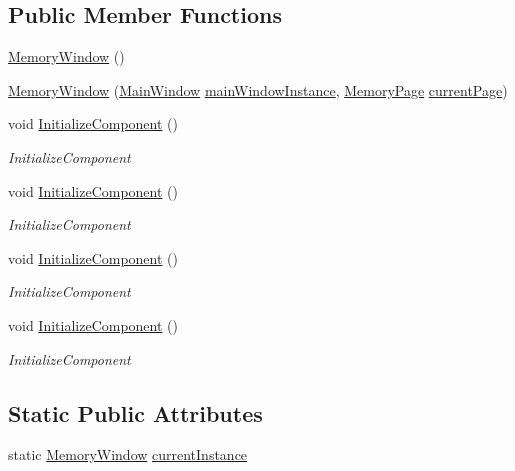 \subsection*{Public Member Functions}
\begin{DoxyCompactItemize}
\item 
\hyperlink{class_c_p_u___o_s___simulator_1_1_memory_window_a9c72b7aa51f734437bd5e4aa26a230a2}{Memory\+Window} ()
\item 
\hyperlink{class_c_p_u___o_s___simulator_1_1_memory_window_a983d730d6caccfeadb419b26a70b0150}{Memory\+Window} (\hyperlink{class_c_p_u___o_s___simulator_1_1_main_window}{Main\+Window} \hyperlink{class_c_p_u___o_s___simulator_1_1_memory_window_a349bd876862c9360ccd4533dc8de8bf3}{main\+Window\+Instance}, \hyperlink{class_c_p_u___o_s___simulator_1_1_memory_1_1_memory_page}{Memory\+Page} \hyperlink{class_c_p_u___o_s___simulator_1_1_memory_window_ae1b974c8b976e19dde1a5491e3fe0e37}{current\+Page})
\item 
void \hyperlink{class_c_p_u___o_s___simulator_1_1_memory_window_a40473c2b8ba30a837cf2a122e0978dec}{Initialize\+Component} ()
\begin{DoxyCompactList}\small\item\em Initialize\+Component \end{DoxyCompactList}\item 
void \hyperlink{class_c_p_u___o_s___simulator_1_1_memory_window_a40473c2b8ba30a837cf2a122e0978dec}{Initialize\+Component} ()
\begin{DoxyCompactList}\small\item\em Initialize\+Component \end{DoxyCompactList}\item 
void \hyperlink{class_c_p_u___o_s___simulator_1_1_memory_window_a40473c2b8ba30a837cf2a122e0978dec}{Initialize\+Component} ()
\begin{DoxyCompactList}\small\item\em Initialize\+Component \end{DoxyCompactList}\item 
void \hyperlink{class_c_p_u___o_s___simulator_1_1_memory_window_a40473c2b8ba30a837cf2a122e0978dec}{Initialize\+Component} ()
\begin{DoxyCompactList}\small\item\em Initialize\+Component \end{DoxyCompactList}\end{DoxyCompactItemize}
\subsection*{Static Public Attributes}
\begin{DoxyCompactItemize}
\item 
static \hyperlink{class_c_p_u___o_s___simulator_1_1_memory_window}{Memory\+Window} \hyperlink{class_c_p_u___o_s___simulator_1_1_memory_window_a870b795e3b919a82888ad608ab24d61a}{current\+Instance}
\end{DoxyCompactItemize}
